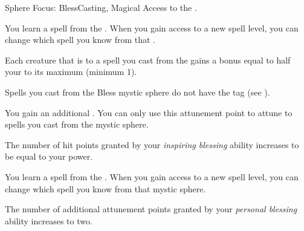    \begin{feat}{Sphere Focus: Bless}{Casting, Magical}
        \featpre Access to the  .

         You learn a spell from the  .
        When you gain access to a new spell level, you can change which spell you know from that .

         Each creature that is  to a spell you cast from the   gains a bonus equal to half your  to its maximum  (minimum 1).

         Spells you cast from the Bless mystic sphere do not have the  tag (see ).

         You gain an additional .
        You can only use this attunement point to attune to spells you cast from the  mystic sphere.

         The number of hit points granted by your \textit{inspiring blessing} ability increases to be equal to your power.

         You learn a spell from the  .
        When you gain access to a new spell level, you can change which spell you know from that mystic sphere.

         The number of additional attunement points granted by your \textit{personal blessing} ability increases to two.
    \end{feat}

